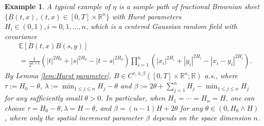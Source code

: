 \documentclass[11pt,reqno]{amsart}
\def\R{\mathbb R}
\newtheorem{example}{Example}[section]
\numberwithin{equation}{section}
\begin{document}
\begin{itemize}
\begin{example}\label{rem:fBs}
A typical example of $\eta$ is a sample path of fractional Brownian sheet $\{B(t,x), (t,x)\in[0,T]\times \mathbb{R}^{n}\}$    with Hurst parameters $H_i\in (0,1),i=0,1, \dots,n$, which is a centered Gaussian random field  with covariance
\begin{align*}
&\mathbb{E}\left[B(t,x)B(s,y)\right] \\
&= \frac{1}{2^{n+1}}\left(|t|^{2H_0} + |s|^{2H_0} - |t-s|^{2H_0} \right)\prod_{i=1}^{n}\left(|x_{i}|^{2H_i}+|y_{i}|^{2H_i} - |x_i - y_i|^{2H_i}\right).
\end{align*}
By Lemma \ref{lem:Hurst parameter}, $B\in C^{\tau, \lambda; \beta}([0,T]\times \R^n; \R)$ a.s., where $\tau := H_{0}-\theta$, $\lambda := \min_{1\le j\le n}H_{j} - \theta$ and $\beta := 2\theta + \sum_{j=1}^{n}H_{j} - \min_{1\le j\le n}H_{j}$ for any sufficiently small $\theta>0$. In particular, when $H_1=\cdots=H_n=H$, one can choose $\tau=H_0-\theta, \lambda=H-\theta$, and $\beta=(n-1)H+2\theta$ for any $\theta\in(0, H_0\wedge H)$, where only the spatial increment parameter $\beta$ depends on the space dimension $n$. 
\end{example}


\end{itemize}
\end{document}
